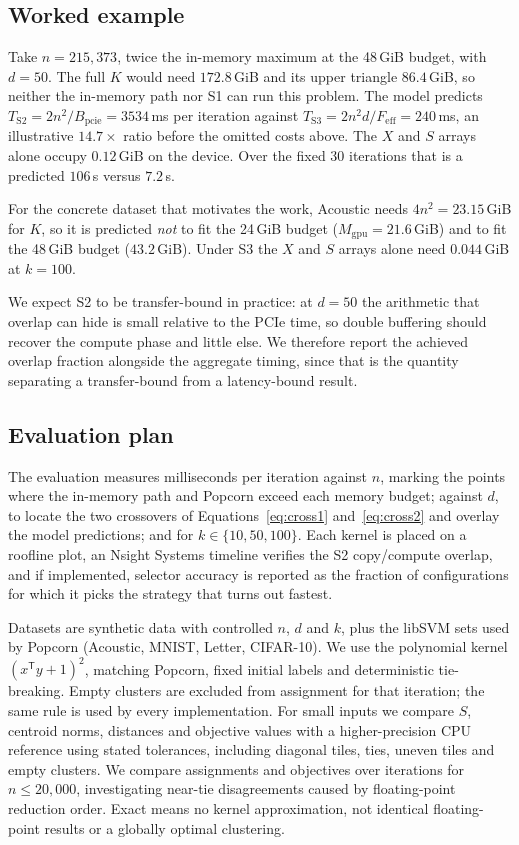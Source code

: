 \documentclass[sigconf]{acmart}
\begin{document}
\subsection{Worked example}

Take $n = 215{,}373$, twice the in-memory maximum at the 48\,GiB budget, with
$d = 50$. The full $K$ would need $172.8$\,GiB and its upper triangle
$86.4$\,GiB, so neither the in-memory path nor S1 can run this problem. The
model predicts $T_{\mathrm{S2}} = 2n^2 / B_{\mathrm{pcie}} = 3534$\,ms per
iteration against $T_{\mathrm{S3}} = 2n^2 d / F_{\mathrm{eff}} = 240$\,ms, an
illustrative $14.7\times$ ratio before the omitted costs above. The $X$ and $S$
arrays alone occupy $0.12$\,GiB on the device. Over the fixed 30 iterations
that is a predicted $106$\,s versus $7.2$\,s.

For the concrete dataset that motivates the work, Acoustic needs
$4n^2 = 23.15$\,GiB for $K$, so it is predicted \emph{not} to fit the 24\,GiB
budget ($M_{\mathrm{gpu}} = 21.6$\,GiB) and to fit the 48\,GiB budget
($43.2$\,GiB). Under S3 the $X$ and $S$ arrays alone need $0.044$\,GiB at
$k = 100$.

We expect S2 to be transfer-bound in practice: at $d = 50$ the arithmetic that
overlap can hide is small relative to the PCIe time, so double buffering should
recover the compute phase and little else. We therefore report the achieved
overlap fraction alongside the aggregate timing, since that is the quantity
separating a transfer-bound from a latency-bound result.

\subsection{Evaluation plan}

The evaluation measures milliseconds per iteration against $n$, marking the
points where the in-memory path and Popcorn exceed each memory budget; against
$d$, to locate the two crossovers of Equations~\eqref{eq:cross1}
and~\eqref{eq:cross2} and overlay the model predictions; and for
$k \in \{10, 50, 100\}$. Each kernel is placed on a roofline plot, an Nsight
Systems timeline verifies the S2 copy/compute overlap, and if implemented,
selector accuracy is reported as the fraction of configurations for which it
picks the strategy that turns out fastest.

Datasets are synthetic data with controlled $n$, $d$ and $k$, plus the libSVM
sets used by Popcorn (Acoustic, MNIST, Letter, CIFAR-10). We use the polynomial
kernel $(x^{\mathsf{T}} y + 1)^2$, matching Popcorn, fixed initial labels and
deterministic tie-breaking. Empty clusters are excluded from assignment for
that iteration; the same rule is used by every implementation. For small inputs
we compare $S$, centroid norms, distances and objective values with a
higher-precision CPU reference using stated tolerances, including diagonal
tiles, ties, uneven tiles and empty clusters. We compare assignments and
objectives over iterations for $n \le 20{,}000$, investigating near-tie
disagreements caused by floating-point reduction order. Exact means no kernel
approximation, not identical floating-point results or a globally optimal
clustering.
\end{document}
